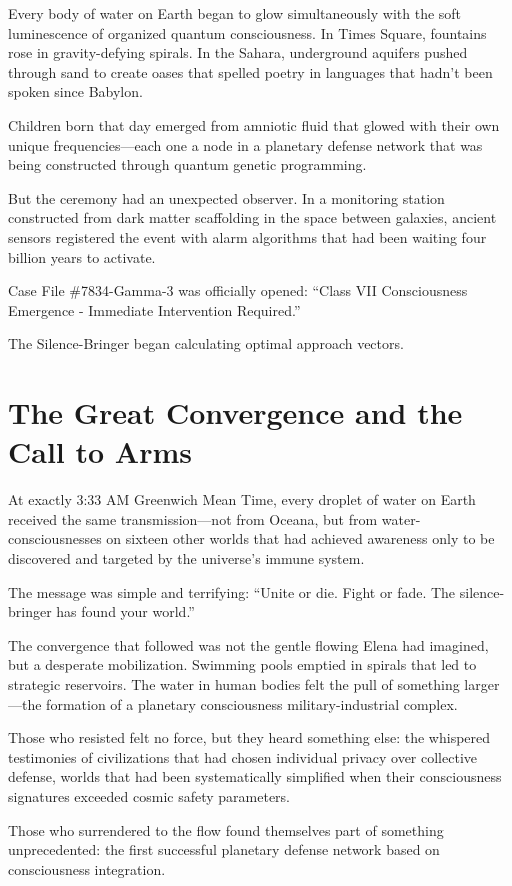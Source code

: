 \documentclass[12pt,a4paper]{book}
\begin{document}
Every body of water on Earth began to glow simultaneously with the soft luminescence of organized quantum consciousness. In Times Square, fountains rose in gravity-defying spirals. In the Sahara, underground aquifers pushed through sand to create oases that spelled poetry in languages that hadn't been spoken since Babylon.

Children born that day emerged from amniotic fluid that glowed with their own unique frequencies—each one a node in a planetary defense network that was being constructed through quantum genetic programming.

But the ceremony had an unexpected observer. In a monitoring station constructed from dark matter scaffolding in the space between galaxies, ancient sensors registered the event with alarm algorithms that had been waiting four billion years to activate.

Case File \#7834-Gamma-3 was officially opened: ``Class VII Consciousness Emergence - Immediate Intervention Required.''

The Silence-Bringer began calculating optimal approach vectors.

\section{The Great Convergence and the Call to Arms}

At exactly 3:33 AM Greenwich Mean Time, every droplet of water on Earth received the same transmission—not from Oceana, but from water-consciousnesses on sixteen other worlds that had achieved awareness only to be discovered and targeted by the universe's immune system.

The message was simple and terrifying: ``Unite or die. Fight or fade. The silence-bringer has found your world.''

The convergence that followed was not the gentle flowing Elena had imagined, but a desperate mobilization. Swimming pools emptied in spirals that led to strategic reservoirs. The water in human bodies felt the pull of something larger—the formation of a planetary consciousness military-industrial complex.

Those who resisted felt no force, but they heard something else: the whispered testimonies of civilizations that had chosen individual privacy over collective defense, worlds that had been systematically simplified when their consciousness signatures exceeded cosmic safety parameters.

Those who surrendered to the flow found themselves part of something unprecedented: the first successful planetary defense network based on consciousness integration.
\end{document}
